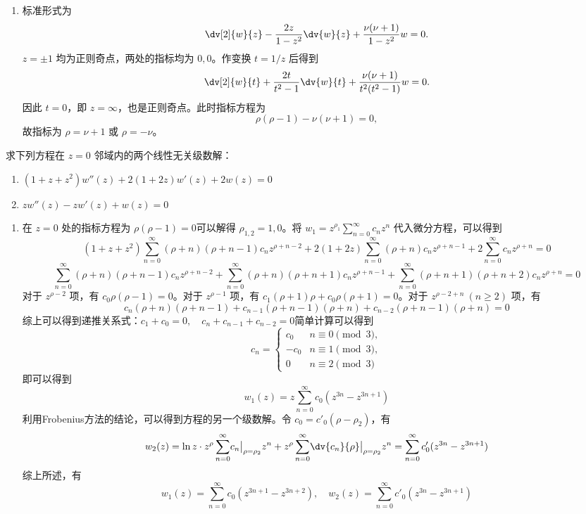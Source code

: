 \begin{question}
\begin{solution}
\begin{enumerate}
  \item 标准形式为
  \[
  \dv[2]{w}{z}-\frac{2z}{1-z^2}\dv{w}{z}
  +\frac{\nu(\nu+1)}{1-z^2}w=0.
  \]
  \(z=\pm1\) 均为正则奇点，两处的指标均为 \(0,0\)。作变换
  \(t=1/z\) 后得到
  \[
  \dv[2]{w}{t}
  +\frac{2t}{t^2-1}\dv{w}{t}
  +\frac{\nu(\nu+1)}{t^2(t^2-1)}w=0.
  \]
  因此 \(t=0\)，即 \(z=\infty\)，也是正则奇点。此时指标方程为
  \[
  \rho(\rho-1)-\nu(\nu+1)=0,
  \]
  故指标为 \(\rho=\nu+1\) 或 \(\rho=-\nu\)。
\end{enumerate}
\end{solution}
\end{question}

\begin{question}
求下列方程在 \(z=0\) 邻域内的两个线性无关级数解：
\begin{enumerate}
  \item \((1+z+z^2) w''(z)+2(1+2z) w'(z)+2 w(z)=0\)
  \item \(z w''(z)-z w'(z)+w(z)=0\)
\end{enumerate}
\begin{solution}
\begin{enumerate}
  \item 在 \(z=0\) 处的指标方程为 \(\rho(\rho-1)=0\)可以解得 \(\rho_{1,2}=1,0\)。将 \(w_1=z^{\rho_1}\sum_{n=0}^\infty c_n z^n\) 代入微分方程，可以得到 \[ (1+z+z^2)\sum_{n=0}^\infty (\rho+n)(\rho+n-1)c_n z^{\rho+n-2}+2(1+2z)\sum_{n=0}^\infty (\rho+n)c_n z^{\rho+n-1}+2\sum_{n=0}^\infty c_n z^{\rho+n}=0 \] \[ \sum_{n=0}^\infty (\rho+n)(\rho+n-1)c_n z^{\rho+n-2}+\sum_{n=0}^\infty (\rho+n)(\rho+n+1)c_n z^{\rho+n-1}+\sum_{n=0}^\infty (\rho+n+1)(\rho+n+2)c_n z^{\rho+n}=0 \]对于 \(z^{\rho-2}\) 项，有 \(c_0\rho(\rho-1)=0\)。对于 \(z^{\rho-1}\) 项，有 \(c_1(\rho+1)\rho+c_0\rho(\rho+1)=0\)。对于 \(z^{\rho-2+n}\ (n\ge 2)\) 项，有 \[ c_n (\rho+n)(\rho+n-1)+c_{n-1}(\rho+n-1)(\rho+n)+c_{n-2}(\rho+n-1)(\rho+n)=0 \]综上可以得到递推关系式：\(c_1+c_0=0,\quad c_n+c_{n-1}+c_{n-2}=0\)简单计算可以得到 \[ c_n=\begin{cases} c_0 & n\equiv0\pmod3,\\ -c_0 & n\equiv1\pmod3,\\ 0 & n\equiv2\pmod3 \end{cases} \]即可以得到 \[ w_1(z)=z\sum_{n=0}^\infty c_0(z^{3n}-z^{3n+1}) \]利用Frobenius方法的结论，可以得到方程的另一个级数解。令 \(c_0=c'_0(\rho-\rho_2)\)，有 \[ w_2(z)=\ln z\cdot z^{\rho}\sum_{n=0}^\infty \bigl.c_n\bigr|_{\rho=\rho_2} z^n+z^{\rho}\sum_{n=0}^\infty \bigl.\dv{c_n}{\rho}\bigr|_{\rho=\rho_2}z^n =\sum_{n=0}^\infty c'_0(z^{3n}-z^{3n+1}) \]综上所述，有 \[ w_1(z)=\sum_{n=0}^\infty c_0(z^{3n+1}-z^{3n+2}),\quad w_2(z)=\sum_{n=0}^\infty c'_0(z^{3n}-z^{3n+1}) \]


\end{enumerate}
\end{solution}
\end{question}
